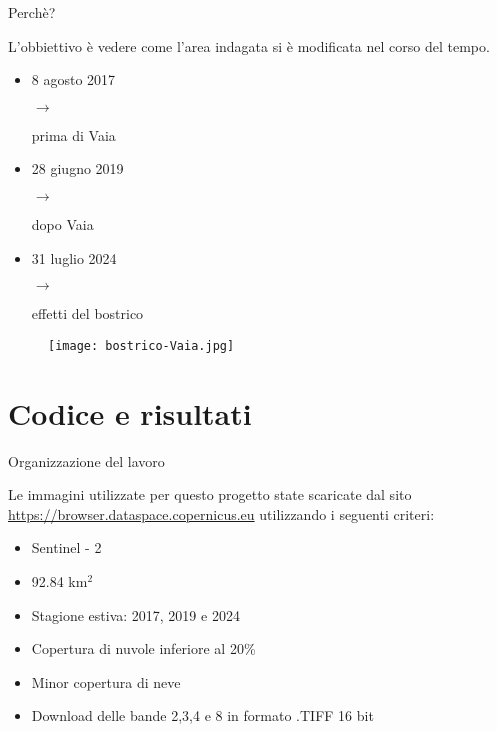 \documentclass{beamer} %
\begin{document}
\begin{frame}{Perchè?}

L'obbiettivo è vedere come l'area indagata si è modificata nel corso del tempo.
\begin{multicols}{2}
\begin{itemize}
    \item 8 agosto 2017 \begin{large} $\rightarrow$ \end{large} prima di Vaia
    \item 28 giugno 2019 \begin{large} $\rightarrow$ \end{large} dopo Vaia
    \item 31 luglio 2024 \begin{large} $\rightarrow$ \end{large} effetti del  bostrico
\end{itemize}
\columnbreak
                \begin{center}
                \begin{figure}
                    \centering
                    \texttt{[image: bostrico-Vaia.jpg]}
                \end{figure}
                \end{center}
\end{multicols}
\end{frame}


\section{Codice e risultati}

        \begin{frame}{Organizzazione del lavoro}
            \begin{center}
            Le immagini utilizzate per questo progetto state scaricate dal sito \url{https://browser.dataspace.copernicus.eu} utilizzando i seguenti criteri: \begin{itemize}
                    \item Sentinel - 2
                    \item 92.84 km$^{2}$
                    \item Stagione estiva: 2017, 2019 e 2024
                    \item Copertura di nuvole inferiore al 20\%
                    \item Minor copertura di neve
                    \item Download delle bande 2,3,4 e 8 in formato .TIFF 16 bit
                \end{itemize}
            \end{center}
        \end{frame}
\end{document}
